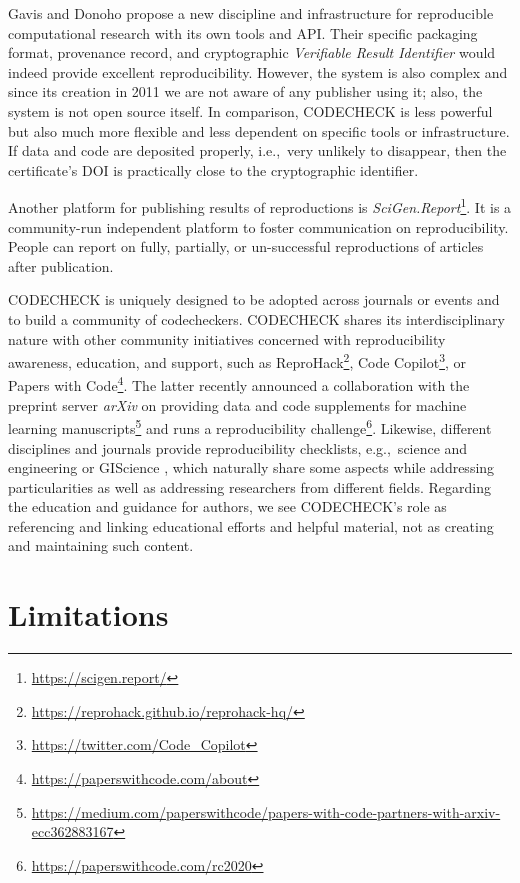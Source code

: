 \documentclass[12pt]{article}
\begin{document}
Gavis and Donoho \cite{gavish_universal_2011} propose a new discipline
and infrastructure for reproducible computational research with its
own tools and API. Their specific packaging format, provenance record,
and cryptographic \emph{Verifiable Result Identifier} would indeed
provide excellent reproducibility. However, the system is also complex
and since its creation in 2011 we are not aware of any publisher using
it; also, the system is not open source itself.  In comparison,
CODECHECK is less powerful but also much more flexible and less
dependent on specific tools or infrastructure. If data and code are
deposited properly, i.e.,~very unlikely to disappear, then the
certificate's DOI is practically close to the cryptographic
identifier.

Another platform for publishing results of reproductions is
\emph{SciGen.Report}\footnote{\url{https://scigen.report/}}.  It is a
community-run independent platform to foster communication on
reproducibility.  People can report on fully, partially, or
un-successful reproductions of articles after publication.

CODECHECK is uniquely designed to be adopted across journals or events
and to build a community of codecheckers. CODECHECK shares its
interdisciplinary nature with other community initiatives concerned
with reproducibility awareness, education, and support, such as
ReproHack\footnote{\url{https://reprohack.github.io/reprohack-hq/}},
Code Copilot\footnote{\url{https://twitter.com/Code_Copilot}}, or
Papers with Code\footnote{\url{https://paperswithcode.com/about}}.
The latter recently announced a collaboration with the preprint server
\emph{arXiv} on providing data and code supplements for machine
learning
manuscripts\footnote{\url{https://medium.com/paperswithcode/papers-with-code-partners-with-arxiv-ecc362883167}}
and runs a reproducibility
challenge\footnote{\url{https://paperswithcode.com/rc2020}}.
Likewise, different disciplines and journals provide reproducibility
checklists, e.g.,~science and engineering \cite{rosenberg_next_2020} or
GIScience \cite{nust_agile_2019}, which naturally share some aspects
while addressing particularities as well as addressing researchers
from different fields. Regarding the education and guidance for
authors, we see CODECHECK's role as referencing and linking
educational efforts and helpful material, not as creating and
maintaining such content.

\section*{Limitations}\label{limitations}
\end{document}
